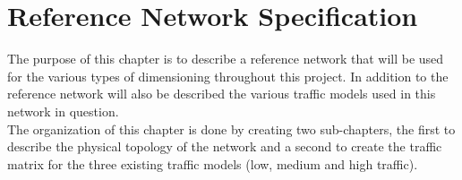 
\chapter{Reference Network Specification}

The purpose of this chapter is to describe a reference network that will be used for the various types of dimensioning throughout this project. In addition to the reference network will also be described the various traffic models used in this network in question.\\
The organization of this chapter is done by creating two sub-chapters, the first to describe the physical topology of the network and a second to create the traffic matrix for the three existing traffic models (low, medium and high traffic).\\



